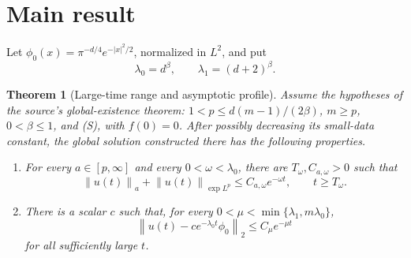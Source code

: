 \documentclass[11pt]{article}
\newtheorem{theorem}{Theorem}
\newcommand{\cE}{\exp L^p}
\newcommand{\norm}[1]{\left\lVert #1\right\rVert}
\begin{document}
\section*{Main result}
Let \(\phi_0(x)=\pi^{-d/4}e^{-|x|^2/2}\), normalized in \(L^2\), and put
\[
 \lambda_0=d^\beta,\qquad \lambda_1=(d+2)^\beta.
\]

\begin{theorem}[Large-time range and asymptotic profile]
Assume the hypotheses of the source's global-existence theorem:
\(1<p\leq d(m-1)/(2\beta)\), \(m\geq p\), \(0<\beta\leq1\), and (S),
with \(f(0)=0\).  After possibly decreasing its small-data constant, the
global solution constructed there has the following properties.

\begin{enumerate}[label=(\roman*),topsep=3pt,itemsep=2pt]
\item For every \(a\in[p,\infty]\) and every \(0<\omega<\lambda_0\),
there are \(T_\omega,C_{a,\omega}>0\) such that
\[
 \norm{u(t)}_a+\norm{u(t)}_{\cE}
 \leq C_{a,\omega}e^{-\omega t},\qquad t\geq T_\omega. \tag{5}
\]
\item There is a scalar \(c\) such that, for every
\(0<\mu<\min\{\lambda_1,m\lambda_0\}\),
\[
 \norm{u(t)-c e^{-\lambda_0t}\phi_0}_2
 \leq C_\mu e^{-\mu t}                                \tag{6}
\]
for all sufficiently large \(t\).
\end{enumerate}
\end{theorem}
\end{document}
